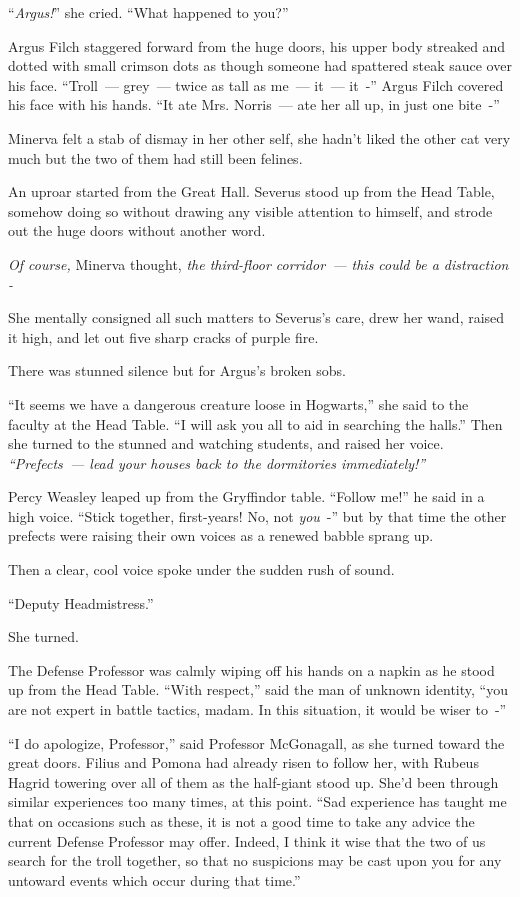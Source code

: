 ``\emph{Argus!}'' she cried. ``What happened to you?''

Argus Filch staggered forward from the huge doors, his upper body streaked and dotted with small crimson dots as though someone had spattered steak sauce over his face. ``Troll~--- grey~--- twice as tall as me~--- it~--- it~-'' Argus Filch covered his face with his hands. ``It ate Mrs. Norris~--- ate her all up, in just one bite~-''

Minerva felt a stab of dismay in her other self, she hadn't liked the other cat very much but the two of them had still been felines.

An uproar started from the Great Hall. Severus stood up from the Head Table, somehow doing so without drawing any visible attention to himself, and strode out the huge doors without another word.

\emph{Of course,} Minerva thought, \emph{the third-floor corridor~--- this could be a distraction -}

She mentally consigned all such matters to Severus's care, drew her wand, raised it high, and let out five sharp cracks of purple fire.

There was stunned silence but for Argus's broken sobs.

``It seems we have a dangerous creature loose in Hogwarts,'' she said to the faculty at the Head Table. ``I will ask you all to aid in searching the halls.'' Then she turned to the stunned and watching students, and raised her voice. \emph{``Prefects~--- lead your houses back to the dormitories immediately!''}

Percy Weasley leaped up from the Gryffindor table. ``Follow me!'' he said in a high voice. ``Stick together, first-years! No, not \emph{you}~-'' but by that time the other prefects were raising their own voices as a renewed babble sprang up.

Then a clear, cool voice spoke under the sudden rush of sound.

``Deputy Headmistress.''

She turned.

The Defense Professor was calmly wiping off his hands on a napkin as he stood up from the Head Table. ``With respect,'' said the man of unknown identity, ``you are not expert in battle tactics, madam. In this situation, it would be wiser to~-''

``I do apologize, Professor,'' said Professor McGonagall, as she turned toward the great doors. Filius and Pomona had already risen to follow her, with Rubeus Hagrid towering over all of them as the half-giant stood up. She'd been through similar experiences too many times, at this point. ``Sad experience has taught me that on occasions such as these, it is not a good time to take any advice the current Defense Professor may offer. Indeed, I think it wise that the two of us search for the troll together, so that no suspicions may be cast upon you for any untoward events which occur during that time.''

